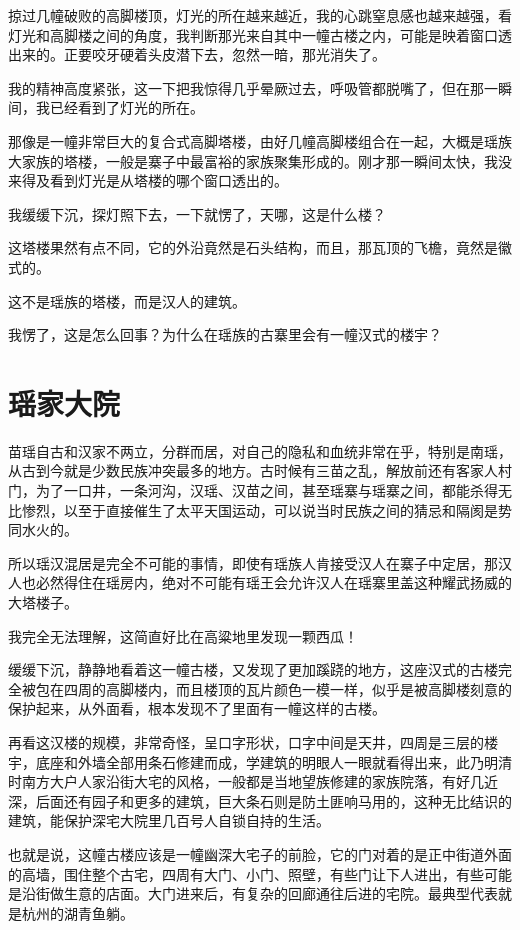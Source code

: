 掠过几幢破败的高脚楼顶，灯光的所在越来越近，我的心跳窒息感也越来越强，看灯光和高脚楼之间的角度，我判断那光来自其中一幢古楼之内，可能是映着窗口透出来的。正要咬牙硬着头皮潜下去，忽然一暗，那光消失了。

我的精神高度紧张，这一下把我惊得几乎晕厥过去，呼吸管都脱嘴了，但在那一瞬间，我已经看到了灯光的所在。

那像是一幢非常巨大的复合式高脚塔楼，由好几幢高脚楼组合在一起，大概是瑶族大家族的塔楼，一般是寨子中最富裕的家族聚集形成的。刚才那一瞬间太快，我没来得及看到灯光是从塔楼的哪个窗口透出的。

我缓缓下沉，探灯照下去，一下就愣了，天哪，这是什么楼？

这塔楼果然有点不同，它的外沿竟然是石头结构，而且，那瓦顶的飞檐，竟然是徽式的。

这不是瑶族的塔楼，而是汉人的建筑。

我愣了，这是怎么回事？为什么在瑶族的古寨里会有一幢汉式的楼宇？

\chapter{瑶家大院}

苗瑶自古和汉家不两立，分群而居，对自己的隐私和血统非常在乎，特别是南瑶，从古到今就是少数民族冲突最多的地方。古时候有三苗之乱，解放前还有客家人村门，为了一口井，一条河沟，汉瑶、汉苗之间，甚至瑶寨与瑶寨之间，都能杀得无比惨烈，以至于直接催生了太平天国运动，可以说当时民族之间的猜忌和隔阂是势同水火的。

所以瑶汉混居是完全不可能的事情，即使有瑶族人肯接受汉人在寨子中定居，那汉人也必然得住在瑶房内，绝对不可能有瑶王会允许汉人在瑶寨里盖这种耀武扬威的大塔楼子。

我完全无法理解，这简直好比在高粱地里发现一颗西瓜！

缓缓下沉，静静地看着这一幢古楼，又发现了更加蹊跷的地方，这座汉式的古楼完全被包在四周的高脚楼内，而且楼顶的瓦片颜色一模一样，似乎是被高脚楼刻意的保护起来，从外面看，根本发现不了里面有一幢这样的古楼。

再看这汉楼的规模，非常奇怪，呈口字形状，口字中间是天井，四周是三层的楼宇，底座和外墙全部用条石修建而成，学建筑的明眼人一眼就看得出来，此乃明清时南方大户人家沿街大宅的风格，一般都是当地望族修建的家族院落，有好几近深，后面还有园子和更多的建筑，巨大条石则是防土匪响马用的，这种无比结识的建筑，能保护深宅大院里几百号人自锁自持的生活。

也就是说，这幢古楼应该是一幢幽深大宅子的前脸，它的门对着的是正中街道外面的高墙，围住整个古宅，四周有大门、小门、照壁，有些门让下人进出，有些可能是沿街做生意的店面。大门进来后，有复杂的回廊通往后进的宅院。最典型代表就是杭州的湖青鱼躺。

